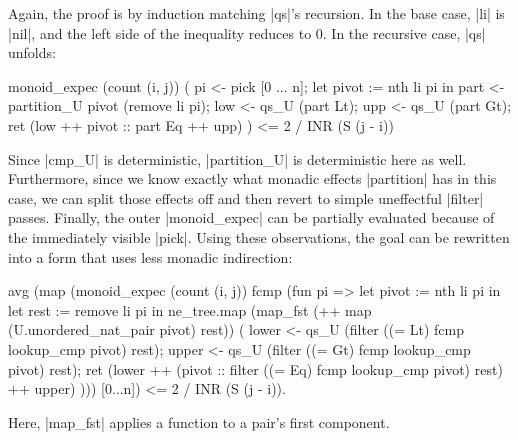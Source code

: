 \documentclass[runningheads]{llncs}
\begin{document}
Again, the proof is by induction matching |qs|'s recursion. In the base case, |li| is |nil|, and the left side of the inequality reduces to 0. In the recursive case, |qs| unfolds:
\begin{code}
monoid_expec (count (i, j)) (
    pi <- pick [0 ... n];
    let pivot := nth li pi in
    part <- partition_U pivot (remove li pi);
    low <- qs_U (part Lt);
    upp <- qs_U (part Gt);
    ret (low ++ pivot :: part Eq ++ upp)
  ) <= 2 / INR (S (j - i))
\end{code}
Since |cmp_U| is deterministic, |partition_U| is deterministic here as well. Furthermore, since we know exactly what monadic effects |partition| has in this case, we can split those effects off and then revert to simple uneffectful |filter| passes. Finally, the outer |monoid_expec| can be partially evaluated because of the immediately visible |pick|. Using these observations, the goal can be rewritten into a form that uses less monadic indirection:

\begin{code}
avg (map (monoid_expec (count (i, j)) fcmp (fun pi =>
    let pivot := nth li pi in
    let rest := remove li pi in
    ne_tree.map (map_fst (++ map (U.unordered_nat_pair pivot) rest)) (
      lower <- qs_U (filter ((= Lt) fcmp lookup_cmp pivot) rest);
      upper <- qs_U (filter ((= Gt) fcmp lookup_cmp pivot) rest);
      ret (lower ++ (pivot :: filter ((= Eq) fcmp lookup_cmp pivot) rest) ++ upper)
    ))) [0...n]) <= 2 / INR (S (j - i)).
\end{code}
Here, |map_fst| applies a function to a pair's first component.
\end{document}
